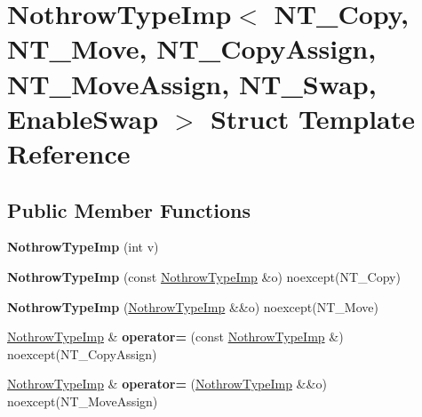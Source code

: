 \hypertarget{struct_nothrow_type_imp}{}\section{Nothrow\+Type\+Imp$<$ N\+T\+\_\+\+Copy, N\+T\+\_\+\+Move, N\+T\+\_\+\+Copy\+Assign, N\+T\+\_\+\+Move\+Assign, N\+T\+\_\+\+Swap, Enable\+Swap $>$ Struct Template Reference}
\label{struct_nothrow_type_imp}
\subsection*{Public Member Functions}
\begin{DoxyCompactItemize}
\item 
\mbox{\label{struct_nothrow_type_imp_a6652d0dd37bcb0c55472ec51b82f5ec9}} 
{\bfseries Nothrow\+Type\+Imp} (int v)
\item 
\mbox{\label{struct_nothrow_type_imp_a3cf43939297b2bfa21e525841a790cfa}} 
{\bfseries Nothrow\+Type\+Imp} (const \mbox{\hyperlink{struct_nothrow_type_imp}{Nothrow\+Type\+Imp}} \&o) noexcept(N\+T\+\_\+\+Copy)
\item 
\mbox{\label{struct_nothrow_type_imp_abc0f709c728636e25afea463dfbbb906}} 
{\bfseries Nothrow\+Type\+Imp} (\mbox{\hyperlink{struct_nothrow_type_imp}{Nothrow\+Type\+Imp}} \&\&o) noexcept(N\+T\+\_\+\+Move)
\item 
\mbox{\label{struct_nothrow_type_imp_a3268159debdf991c58d2dfcf54ffee39}} 
\mbox{\hyperlink{struct_nothrow_type_imp}{Nothrow\+Type\+Imp}} \& {\bfseries operator=} (const \mbox{\hyperlink{struct_nothrow_type_imp}{Nothrow\+Type\+Imp}} \&) noexcept(N\+T\+\_\+\+Copy\+Assign)
\item 
\mbox{\label{struct_nothrow_type_imp_a82dff03e0bd37deb0ba1ebb4d8e057e6}} 
\mbox{\hyperlink{struct_nothrow_type_imp}{Nothrow\+Type\+Imp}} \& {\bfseries operator=} (\mbox{\hyperlink{struct_nothrow_type_imp}{Nothrow\+Type\+Imp}} \&\&o) noexcept(N\+T\+\_\+\+Move\+Assign)
\end{DoxyCompactItemize}
